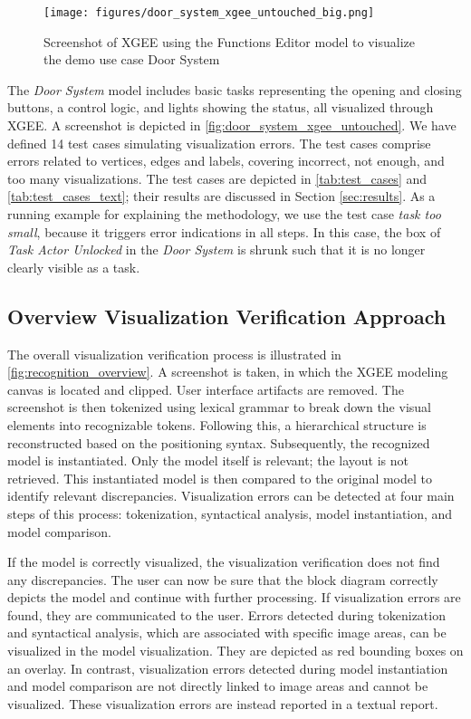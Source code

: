 \begin{figure}[htb]
  \centering
  \texttt{[image: figures/door\_system\_xgee\_untouched\_big.png]}
  \caption{Screenshot of XGEE using the Functions Editor model to visualize the demo use case Door System}
  
  \label{fig:door_system_xgee_untouched}
\end{figure}

The \emph{Door System} model includes basic tasks representing the opening and closing buttons, a control logic, and lights showing the status, all visualized through XGEE. A screenshot is depicted in \autoref{fig:door_system_xgee_untouched}. 
We have defined 14 test cases simulating visualization errors. The test cases comprise errors related to vertices, edges and labels, covering incorrect, not enough, and too many visualizations. The test cases are depicted in \autoref{tab:test_cases} and \autoref{tab:test_cases_text}; their results are discussed in Section \ref{sec:results}. As a running example for explaining the methodology, we use the test case \emph{task too small}, because it triggers error indications in all steps. In this case, the box of \emph{Task Actor Unlocked} in the \emph{Door System} is shrunk such that it is no longer clearly visible as a task. 

\subsection{Overview Visualization Verification Approach}

The overall visualization verification process is illustrated in \autoref{fig:recognition_overview}. A screenshot is taken, in which the XGEE modeling canvas is located and clipped. User interface artifacts are removed. The screenshot is then tokenized using lexical grammar to break down the visual elements into recognizable tokens. Following this, a hierarchical structure is reconstructed based on the positioning syntax.
Subsequently, the recognized model is instantiated. Only the model itself is relevant; the layout is not retrieved.  This instantiated model is then compared to the original model to identify relevant discrepancies. Visualization errors can be detected at four main steps of this process: tokenization, syntactical analysis, model instantiation, and model comparison. 

If the model is correctly visualized, the visualization verification does not find any discrepancies. The user can now be sure that the block diagram correctly depicts the model and continue with further processing. If visualization errors are found, they are communicated to the user. Errors detected during tokenization and syntactical analysis, which are associated with specific image areas, can be visualized in the model visualization. They are depicted as red bounding boxes on an overlay. In contrast, visualization errors detected during model instantiation and model comparison are not directly linked to image areas and cannot be visualized. These visualization errors are instead reported in a textual report. 


